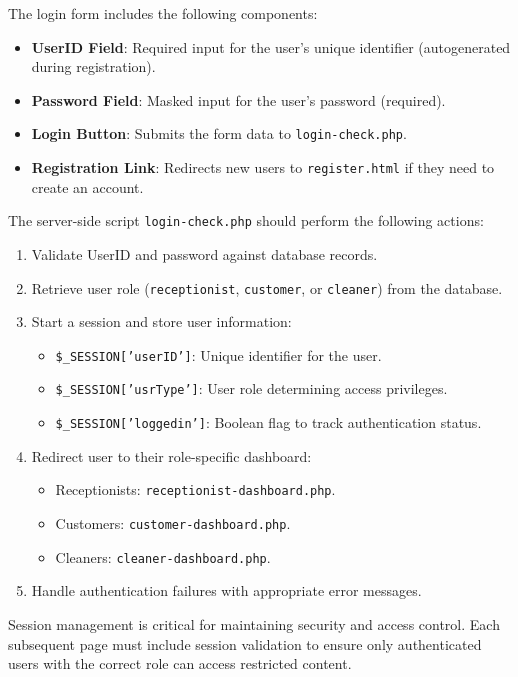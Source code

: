 \documentclass[12pt]{article}
\begin{document}
The login form includes the following components:

\begin{itemize}
    \item \textbf{UserID Field}: Required input for the user's unique identifier (autogenerated during registration).
    \item \textbf{Password Field}: Masked input for the user's password (required).
    \item \textbf{Login Button}: Submits the form data to \texttt{login-check.php}.
    \item \textbf{Registration Link}: Redirects new users to \texttt{register.html} if they need to create an account.
\end{itemize}

The server-side script \texttt{login-check.php} should perform the following actions:

\begin{enumerate}
    \item Validate UserID and password against database records.
    \item Retrieve user role (\texttt{receptionist}, \texttt{customer}, or \texttt{cleaner}) from the database.
    \item Start a session and store user information:
    \begin{itemize}
        \item \texttt{\$\_SESSION['userID']}: Unique identifier for the user.
        \item \texttt{\$\_SESSION['usrType']}: User role determining access privileges.
        \item \texttt{\$\_SESSION['loggedin']}: Boolean flag to track authentication status.
    \end{itemize}
    \item Redirect user to their role-specific dashboard:
    \begin{itemize}
        \item Receptionists: \texttt{receptionist-dashboard.php}.
        \item Customers: \texttt{customer-dashboard.php}.
        \item Cleaners: \texttt{cleaner-dashboard.php}.
    \end{itemize}
    \item Handle authentication failures with appropriate error messages.
\end{enumerate}

Session management is critical for maintaining security and access control. Each subsequent page must include session validation to ensure only authenticated users with the correct role can access restricted content.
\end{document}
